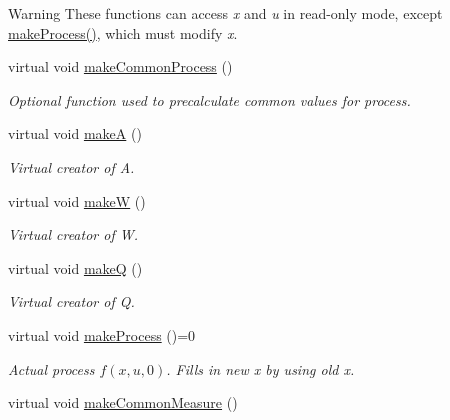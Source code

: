 \begin{Indent}
{\begin{DoxyWarning}{Warning}
These functions can access {\itshape x} and {\itshape u} in read-\/only mode, except \mbox{\hyperlink{classKalman_1_1EKFilter_a778232d397d981c08b3ca23ea800aa6a}{make\+Process()}}, which must modify {\itshape x}. 
\end{DoxyWarning}
}\begin{DoxyCompactItemize}
\item 
virtual void \mbox{\hyperlink{classKalman_1_1EKFilter_aace6f213340e7a0c78541454b13e8586}{make\+Common\+Process}} ()
\begin{DoxyCompactList}\small\item\em Optional function used to precalculate common values for process. \end{DoxyCompactList}\item 
\mbox{\label{classKalman_1_1EKFilter_aa2cd9e16f121fe26802a133b4cb37f59}} 
virtual void \mbox{\hyperlink{classKalman_1_1EKFilter_aa2cd9e16f121fe26802a133b4cb37f59}{makeA}} ()
\begin{DoxyCompactList}\small\item\em Virtual creator of {\itshape A}. \end{DoxyCompactList}\item 
\mbox{\label{classKalman_1_1EKFilter_ac0ea9285a523d219835f7ca2ce932902}} 
virtual void \mbox{\hyperlink{classKalman_1_1EKFilter_ac0ea9285a523d219835f7ca2ce932902}{makeW}} ()
\begin{DoxyCompactList}\small\item\em Virtual creator of {\itshape W}. \end{DoxyCompactList}\item 
virtual void \mbox{\hyperlink{classKalman_1_1EKFilter_ab9765c4cbe0f67a1aa82ddfbc8173877}{makeQ}} ()
\begin{DoxyCompactList}\small\item\em Virtual creator of {\itshape Q}. \end{DoxyCompactList}\item 
virtual void \mbox{\hyperlink{classKalman_1_1EKFilter_a778232d397d981c08b3ca23ea800aa6a}{make\+Process}} ()=0
\begin{DoxyCompactList}\small\item\em Actual process $ f(x, u, 0) $. Fills in new {\itshape x} by using old {\itshape x}. \end{DoxyCompactList}\item 
virtual void \mbox{\hyperlink{classKalman_1_1EKFilter_a89337cacd8115338ffd34637f0ecbd92}{make\+Common\+Measure}} ()

\end{DoxyCompactItemize}
\end{Indent}
